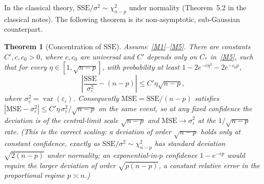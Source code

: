 \documentclass[14pt]{extarticle}
\theoremstyle{plain}
\newtheorem{theorem}{Theorem}[section]
\theoremstyle{definition}
\theoremstyle{remark}
\DeclareMathOperator\var{var}
\newcommand{\SSE}{\mathrm{SSE}}
\newcommand{\MSE}{\mathrm{MSE}}
\begin{document}
In the classical theory, $\SSE/\sigma^2 \sim \chi^2_{n-p}$ under normality (Theorem~5.2 in the classical notes). The following theorem is its non-asymptotic, sub-Gaussian counterpart.

\begin{theorem}[Concentration of $\SSE$]\label{thm:sse-concentration}
Assume~\ref{M1}--\ref{M5}. There are constants $C', c, c_0 > 0$, where $c, c_0$ are universal and $C'$ depends only on $C_*$ in~\ref{M5}, such that for every $\eta \in [1, \sqrt{n-p}]$, with probability at least $1 - 2e^{-c\eta^2} - 2e^{-c_0 p}$,
\begin{equation}\label{eq:sse-concentration}
\left|\frac{\SSE}{\sigma_\varepsilon^2} - (n-p)\right| \leqslant C'\eta\sqrt{n-p},
\end{equation}
where $\sigma_\varepsilon^2 = \var(\varepsilon_i)$. Consequently $\MSE = \SSE/(n-p)$ satisfies $|\MSE - \sigma_\varepsilon^2| \leqslant C'\eta\,\sigma_\varepsilon^2/\sqrt{n-p}$ on the same event, so at any fixed confidence the deviation is of the central-limit scale $\sqrt{n-p}$ and $\MSE \to \sigma_\varepsilon^2$ at the $1/\sqrt{n-p}$ rate. (This is the correct scaling: a deviation of order $\sqrt{n-p}$ holds only at constant confidence, exactly as $\SSE/\sigma^2 \sim \chi^2_{n-p}$ has standard deviation $\sqrt{2(n-p)}$ under normality; an exponential-in-$p$ confidence $1 - e^{-cp}$ would require the larger deviation of order $\sqrt{p(n-p)}$, a constant relative error in the proportional regime $p \asymp n$.)
\end{theorem}
\end{document}
